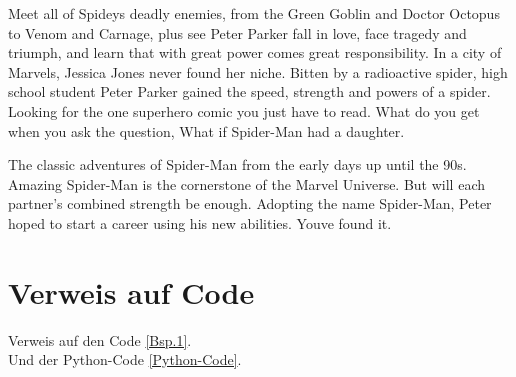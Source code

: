 Meet all of Spideys deadly enemies, from the Green Goblin and Doctor Octopus to Venom and Carnage, plus see Peter Parker fall in love, face tragedy and triumph, and learn that with great power comes great responsibility. In a city of Marvels, Jessica Jones never found her niche. Bitten by a radioactive spider, high school student Peter Parker gained the speed, strength and powers of a spider. Looking for the one superhero comic you just have to read. What do you get when you ask the question, What if Spider-Man had a daughter.

The classic adventures of Spider-Man from the early days up until the 90s. Amazing Spider-Man is the cornerstone of the Marvel Universe. But will each partner’s combined strength be enough. Adopting the name Spider-Man, Peter hoped to start a career using his new abilities. Youve found it.

\section{Verweis auf Code}
Verweis auf den Code \autoref{Bsp.1}.\\
Und der Python-Code \autoref{Python-Code}.